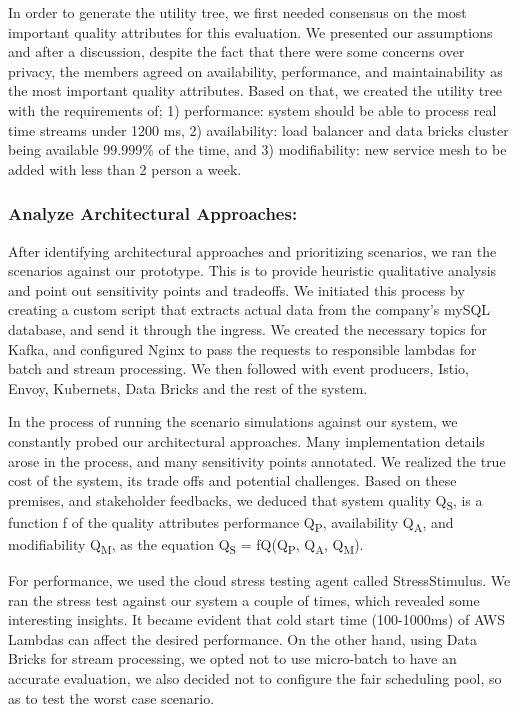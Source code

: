 \documentclass[runningheads]{llncs}
\begin{document}
In order to generate the utility tree, we first needed consensus on the most important quality attributes for this evaluation. We presented our assumptions and after a discussion, despite the fact that there were some concerns over privacy, the members agreed on availability, performance, and maintainability as the most important quality attributes. Based on that, we created the utility tree with the requirements of; 1) performance: system should be able to process real time streams under 1200 ms, 2) availability: load balancer and data bricks cluster being available 99.999\% of the time, and 3) modifiability: new service mesh to be added with less than 2 person a week.

\subsubsection{Analyze Architectural Approaches: }

After identifying architectural approaches and prioritizing scenarios, we ran the scenarios against our prototype. This is to provide heuristic qualitative analysis and point out sensitivity points and tradeoffs. We initiated this process by creating a custom script that extracts actual data from the company's mySQL database, and send it through the ingress. We created the necessary topics for Kafka, and configured Nginx to pass the requests to responsible lambdas for batch and stream processing. We then followed with event producers, Istio, Envoy, Kubernets, Data Bricks and the rest of the system. 

In the process of running the scenario simulations against our system, we constantly probed our architectural approaches. 
Many implementation details arose in the process, and many sensitivity points annotated. We realized the true cost of the system, its trade offs and potential challenges. Based on these premises, and stakeholder feedbacks, we deduced that system quality Q\textsubscript{S}, is a function f of the quality attributes performance Q\textsubscript{P}, availability Q\textsubscript{A}, and modifiability Q\textsubscript{M}, as the equation Q\textsubscript{S} = fQ(Q\textsubscript{P}, Q\textsubscript{A}, Q\textsubscript{M}).

For performance, we used the cloud stress testing agent called StressStimulus. We ran the stress test against our system a couple of times, which revealed some interesting insights. It became evident that cold start time (100-1000ms) of AWS Lambdas can affect the desired performance. On the other hand, using Data Bricks for stream processing, we opted not to use micro-batch to have an accurate evaluation, we also decided not to configure the fair scheduling pool, so as to test the worst case scenario. 
\end{document}
